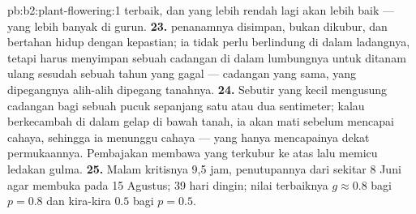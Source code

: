\begin{solution}{pb:b2:plant-flowering:1}
terbaik, dan yang lebih rendah lagi akan lebih baik ---  yang
lebih banyak di gurun.
\textbf{23.}  penanamnya disimpan, bukan dikubur, dan bertahan
hidup dengan kepastian; ia tidak perlu berlindung di dalam ladangnya,
tetapi harus menyimpan sebuah cadangan di dalam lumbungnya untuk
ditanam ulang sesudah sebuah tahun yang gagal --- cadangan yang sama,
yang dipegangnya alih-alih dipegang tanahnya.
\textbf{24.} Sebutir  yang kecil mengusung cadangan bagi sebuah
pucuk sepanjang satu atau dua sentimeter; kalau berkecambah di dalam
gelap di bawah tanah, ia akan mati sebelum mencapai cahaya, sehingga ia
menunggu cahaya --- yang hanya mencapainya dekat permukaannya.
Pembajakan membawa  yang terkubur ke atas lalu memicu ledakan
gulma.
\textbf{25.} Malam kritisnya 9,5 jam, penutupannya dari sekitar 8 Juni
agar membuka pada 15 Agustus; 39 hari dingin; nilai terbaiknya
$g \approx 0.8$ bagi $p = 0.8$ dan kira-kira $0.5$ bagi $p = 0.5$.
\end{solution}

